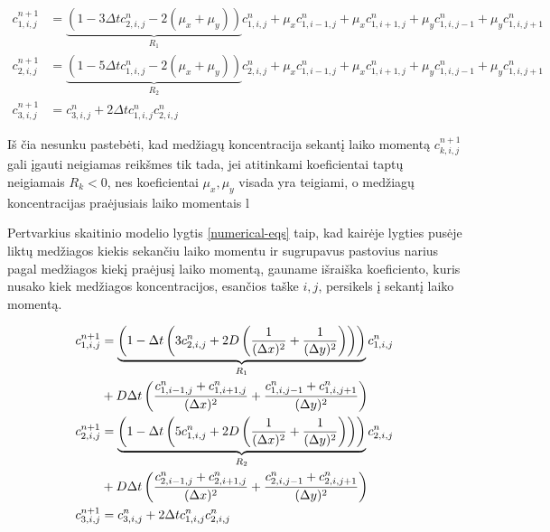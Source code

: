 \begin{subequations}
    \begin{align}
    c^{n+1}_{1,i,j}&=\underbrace{(1-3\Delta tc^{n}_{2,i,j}-2(\mu_x+\mu_y))}_{R_1}c^n_{1,i,j}+\mu_xc^n_{1,i-1,j}+\mu_xc^n_{1,i+1,j}+\mu_yc^n_{1,i,j-1}+\mu_yc^n_{1,i,j+1}\\
    c^{n+1}_{2,i,j}&=\underbrace{(1-5\Delta tc^{n}_{1,i,j}-2(\mu_x+\mu_y))}_{R_2}c^n_{2,i,j}+\mu_xc^n_{1,i-1,j}+\mu_xc^n_{1,i+1,j}+\mu_yc^n_{1,i,j-1}+\mu_yc^n_{1,i,j+1}\\
    c^{n+1}_{3,i,j}&=c^n_{3,i,j}+2\Delta tc^{n}_{1,i,j}c^{n}_{2,i,j}
    \end{align}
\end{subequations}

Iš čia nesunku pastebėti, kad medžiagų koncentracija sekantį laiko momentą $c^{n+1}_{k,i,j}$ gali įgauti neigiamas reikšmes tik tada, jei atitinkami koeficientai taptų neigiamais $R_k<0$, nes koeficientai $\mu_x,\mu_y$ visada yra teigiami, o medžiagų koncentracijas praėjusiais laiko momentais l


Pertvarkius skaitinio modelio lygtis \eqref{numerical-eqs} taip, kad kairėje lygties pusėje liktų medžiagos kiekis sekančiu laiko momentu ir sugrupavus pastovius narius pagal medžiagos kiekį praėjusį laiko momentą, gauname išraiška koeficiento, kuris nusako kiek medžiagos koncentracijos, esančios taške $i,j$, persikels į sekantį laiko momentą. 

\begin{subequations}
    \begin{align}
    c^{n+1}_{1,i,j}&=\underbrace{\left(1-\Delta t\left(3c^{n}_{2,i,j}+2D\left(\frac{1}{(\Delta x)^2}+\frac{1}{(\Delta y)^2}\right)\right)\right)}_{R_1}c^n_{1,i,j}\notag\\
    &+D\Delta t\left(\frac{c^n_{1,i-1,j}+c^n_{1,i+1,j}}{(\Delta x)^2}
    +\frac{c^n_{1,i,j-1}+c^n_{1,i,j+1}}{(\Delta y)^2}\right)\\
    c^{n+1}_{2,i,j}&=
    \underbrace{\left(1-\Delta t\left(5c^{n}_{1,i,j}
    +2D\left(\frac{1}{(\Delta x)^2}+\frac{1}{(\Delta y)^2}\right)\right)\right)}_{R_2}c^n_{2,i,j}\notag\\
    &+D\Delta t\left(\frac{c^n_{2,i-1,j}+c^n_{2,i+1,j}}{(\Delta x)^2}+\frac{c^n_{2,i,j-1}+c^n_{2,i,j+1}}{(\Delta y)^2}\right)\\
    c^{n+1}_{3,i,j}&=c^n_{3,i,j}+2\Delta tc^{n}_{1,i,j}c^{n}_{2,i,j}
    \end{align}
\end{subequations}



